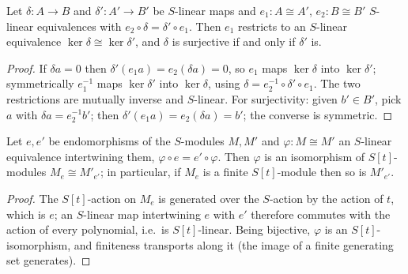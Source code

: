 \begin{lemma}
  \label{lem:kerCongr}
  \leanok
  Let \(\delta : A \to B\) and \(\delta' : A' \to B'\) be \(S\)-linear maps and
  \(e_1 : A \cong A'\), \(e_2 : B \cong B'\) \(S\)-linear equivalences with
  \(e_2 \circ \delta = \delta' \circ e_1\). Then \(e_1\) restricts to an \(S\)-linear
  equivalence \(\ker \delta \cong \ker \delta'\), and \(\delta\) is surjective if and
  only if \(\delta'\) is.
\end{lemma}
\begin{proof}
  \leanok
  If \(\delta a = 0\) then \(\delta'(e_1 a) = e_2(\delta a) = 0\), so \(e_1\) maps
  \(\ker\delta\) into \(\ker\delta'\); symmetrically \(e_1^{-1}\) maps
  \(\ker\delta'\) into \(\ker\delta\), using \(\delta = e_2^{-1} \circ \delta' \circ
  e_1\). The two restrictions are mutually inverse and \(S\)-linear. For surjectivity:
  given \(b' \in B'\), pick \(a\) with \(\delta a = e_2^{-1} b'\); then
  \(\delta'(e_1 a) = e_2(\delta a) = b'\); the converse is symmetric.
\end{proof}

\begin{lemma}
  \label{lem:aevalCongr}
  \leanok
  Let \(e, e'\) be endomorphisms of the \(S\)-modules \(M, M'\) and
  \(\varphi : M \cong M'\) an \(S\)-linear equivalence intertwining them,
  \(\varphi \circ e = e' \circ \varphi\). Then \(\varphi\) is an isomorphism of
  \(S[t]\)-modules \(M_e \cong M'_{e'}\); in particular, if \(M_e\) is a finite
  \(S[t]\)-module then so is \(M'_{e'}\).
\end{lemma}
\begin{proof}
  \leanok
  The \(S[t]\)-action on \(M_e\) is generated over the \(S\)-action by the action of
  \(t\), which is \(e\); an \(S\)-linear map intertwining \(e\) with \(e'\) therefore
  commutes with the action of every polynomial, i.e.\ is \(S[t]\)-linear. Being
  bijective, \(\varphi\) is an \(S[t]\)-isomorphism, and finiteness transports along it
  (the image of a finite generating set generates).
\end{proof}

